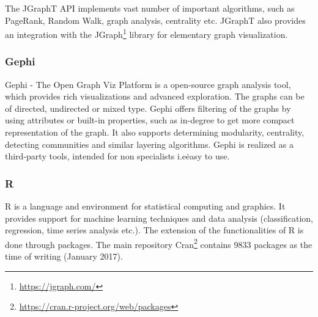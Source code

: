 The JGraphT API implements vast number of important algorithms, such as PageRank, Random Walk, graph analysis, centrality etc.
JGraphT also provides an integration with the JGraph\footnote{\url{https://jgraph.com/}} library for elementary graph visualization.

\subsubsection{Gephi}

Gephi - The Open Graph Viz Platform is a open-source graph analysis tool, 
which provides rich visualizations and advanced exploration\cite{Gephi}.
The graphs can be of directed, undirected or mixed type\cite{Gephi:GraphAPI}.
Gephi offers filtering of the graphs by using attributes or built-in properties, 
such as in-degree to get more compact representation of the graph. 
It also supports determining modularity, centrality, detecting communities and similar layering algorithms.
Gephi is realized as a third-party tools, intended for non specialists i.e\. easy to use.

\subsubsection{R}

R is a language and environment for statistical computing and graphics\cite{R-project}.
It provides support for machine learning techniques and data analysis (classification, regression, time series analysis etc.).
The extension of the functionalities of R is done through packages.
The main repository Cran\footnote{\url{https://cran.r-project.org/web/packages}} 
contains 9833 packages as the time of writing (January 2017).

